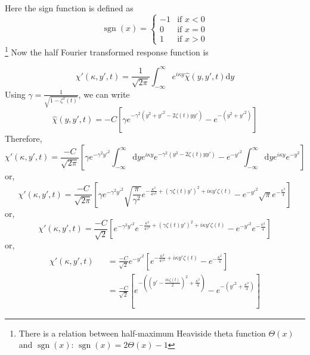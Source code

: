 \documentclass[jcp,groupaddress]{revtex4-1}
\DeclareMathOperator{\sign}{sgn}
\newcommand{\eq}{\begin{equation}}
\newcommand{\qe}{\end{equation}}
\newcommand{\lp}{\left(}
\newcommand{\rp}{\right)}
\newcommand{\diff}{\mathrm{d}}
\newcommand{\threepartdef}[6]
{
	\left\{
		\begin{array}{lll}
			#1 & \mbox{if } #2 \\
			#3 & \mbox{if } #4 \\
			#5 & \mbox{if } #6
		\end{array}
	\right.
}
\begin{document}
Here the sign function is defined as 
\eq
\sign(x) = \threepartdef { -1} {x < 0} {0} {x = 0} {1} {x>0} 
\qe
\footnote{There is a relation between half-maximum Heaviside theta function $\Theta(x)$ and $\sign(x)$: $\sign(x) = 2\Theta(x)-1$}
Now the half Fourier transformed response function is 

\eq
 \chi'(\kappa, y', t) = \frac{1}{\sqrt{2\pi}}\int_{-\infty}^{\infty} e^{i\kappa y} \hat{\chi}(y, y', t)\diff y
\qe
Using $\gamma = \frac{1}{\sqrt{1-\zeta^2(t)}}$, we can write
\eq
 \hat{\chi}(y, y', t) = -C\left[ \gamma e^{-\gamma^2 \lp y^{2}+{y'}^{2}-2\zeta(t)yy'\rp} -e^{-(y^2+{y'}^{2})}\right]
\qe
Therefore, 
\eq
 \chi'(\kappa, y', t) = \frac{-C}{\sqrt{2\pi}}\left[ \gamma e^{-\gamma^2 {y'}^{2}}\int_{-\infty}^{\infty} \diff y e^{i\kappa y} e^{-\gamma^2 \lp y^2 -2\zeta(t) y y'\rp} -e^{-{y'}^2}\int_{-\infty}^{\infty} \diff y e^{i\kappa y} e^{-y^2} \right]
\qe
or,
\eq
 \chi'(\kappa, y', t) = \frac{-C}{\sqrt{2\pi}}\left[ \gamma e^{-\gamma^2 {y'}^{2}} \sqrt{\frac{\pi}{\gamma^2} }e^{-\frac{\kappa^2}{4\gamma^2} + (\gamma \zeta(t)y')^2+ i\kappa y' \zeta(t)} -e^{-{y'}^2} \sqrt{\pi} e^{-\frac{\kappa^2}{4} } \right]
\qe
or,
\eq
 \chi'(\kappa, y', t) = \frac{-C}{\sqrt{2}}\left[  e^{-\gamma^2 {y'}^{2}} e^{-\frac{\kappa^2}{4\gamma^2} + (\gamma \zeta(t)y')^2+ i\kappa y' \zeta(t)} -e^{-{y'}^2}  e^{-\frac{\kappa^2}{4} } \right]
\qe
or, 
\begin{eqnarray}
\chi'(\kappa, y', t) &&= \frac{-C}{\sqrt{2}}e^{-{y'}^{2}} \left[  e^{-\frac{\kappa^2}{4\gamma^2} + i\kappa y' \zeta(t)} -  e^{-\frac{\kappa^2}{4} } \right]\\
&& = \frac{-C}{\sqrt{2}} \left[  e^{-\lp \lp y'-\frac{i\kappa \zeta(t)}{2} \rp^{2}+ \frac{\kappa^2}{4}\rp} -  e^{- \lp {y'}^{2}+\frac{\kappa^2}{4}\rp } \right]
\end{eqnarray}
\end{document}

